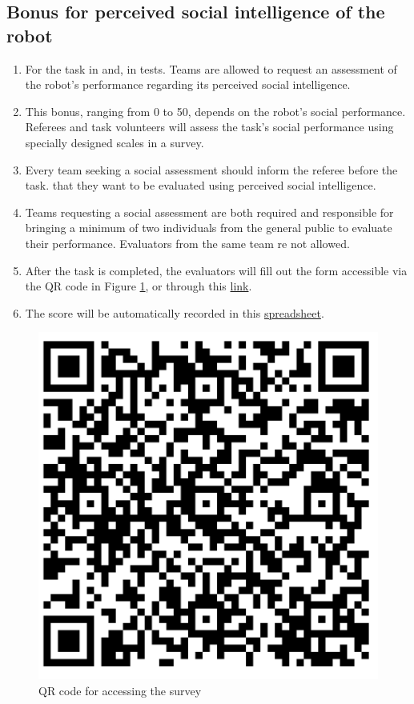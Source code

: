 \subsection{Bonus for perceived social intelligence of the robot}\label{rule:perceived_intelligence}
\begin{enumerate}	
    \item For the task  in  and,  in  tests. Teams are allowed to request an assessment of the robot's performance regarding its perceived social intelligence.
    
    \item This bonus, ranging from 0 to 50, depends on the robot's social performance. Referees and task volunteers will assess the task's social performance using specially designed scales in a survey.

    \item Every team seeking a social assessment should inform the referee before the task. that they want to be evaluated using perceived social intelligence.
    
    \item Teams requesting a social assessment are both required and responsible for bringing a minimum of two individuals from the general public to evaluate their performance. Evaluators from the same team re not allowed.
    
    \item After the task is completed, the evaluators will fill out the form accessible via the QR code in Figure \ref{fig:qr-survey}, or through this \href{https://forms.office.com/Pages/ResponsePage.aspx?id=6sSEXw03nkuDDHVvi_G1H7VNGCdGFtZJs0ryJVVWtCFUQVFSWDlYM0FHRVA2QllIT0tOQjI2QUcxQi4u}{link}.
    
    \item The score will be automatically recorded in this \href{https://urjc-my.sharepoint.com/:x:/r/personal/juan_pena_urjc_es/Documents/ROBOCUP%20@HOME%20PSI%20SCALE%20PROPOSAL.xlsx?d=wfdc816bee34742e1a9e5bea95677985d&csf=1&web=1&e=zRwl4u}{spreadsheet}.
\end{enumerate}

\begin{figure}[H]
    \centering    \includegraphics[width=0.3\linewidth]{images/QRCode for ROBOCUP @HOME PSI SCALE PROPOSAL(1).png}
    \caption{QR code for accessing the survey}
    \label{fig:qr-survey}
\end{figure}

